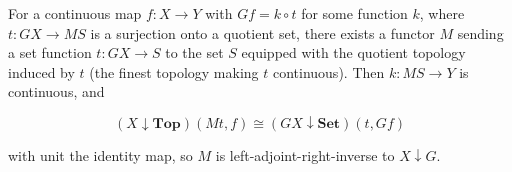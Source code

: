 For a continuous map $f: X \to Y$ with $Gf = k \circ t$ for some function $k$, where $t: GX \to MS$ is a surjection onto a quotient set, there exists a functor $M$ sending a set function $t: GX \to S$ to the set $S$ equipped with the quotient topology induced by $t$ (the finest topology making $t$ continuous). Then $k: MS \to Y$ is continuous, and

$$(X \downarrow \mathbf{Top}) (Mt, f) \cong (GX \downarrow \mathbf{Set}) (t, Gf)$$

with unit the identity map, so $M$ is left-adjoint-right-inverse to $X \downarrow G$.

